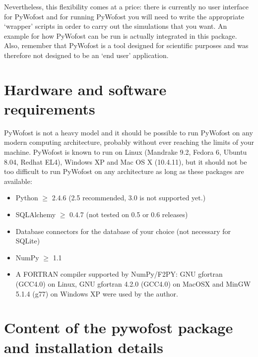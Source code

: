 \documentclass[12pt]{article}
\begin{document}
Nevertheless, this flexibility comes at a price: there is currently no user interface for PyWofost and for running PyWofost you will need to write the appropriate `wrapper' scripts in order to carry out the simulations that you want. An example for how PyWofost can be run is actually integrated in this package. Also, remember that PyWofost is a tool designed for scientific purposes and was therefore not designed to be an `end user' application.


\section{Hardware and software requirements}

PyWofost is not a heavy model and it should be possible to run PyWofost on any modern computing architecture, probably without ever reaching the limits of your machine. PyWofost is known to run on Linux (Mandrake 9.2, Fedora 6, Ubuntu 8.04, Redhat EL4), Windows XP and Mac OS X (10.4.11), but it should not be too difficult to run PyWofost on any architecture as long as these packages are available:
\begin{itemize}
	\item Python $\geq$ 2.4.6 (2.5 recommended, 3.0 is not supported yet.)
	\item SQLAlchemy $\geq$ 0.4.7 (not tested on 0.5 or 0.6 releases)
	\item Database connectors for the database of your choice (not necessary for SQLite)
	\item NumPy $\geq$ 1.1
	\item A FORTRAN compiler supported by NumPy/F2PY: GNU gfortran (GCC4.0) on Linux, GNU gfortran 4.2.0 (GCC4.0) on MacOSX and MinGW 5.1.4 (g77) on Windows XP were used by the author.
\end{itemize}


\section{Content of the pywofost package and installation details}
\end{document}

